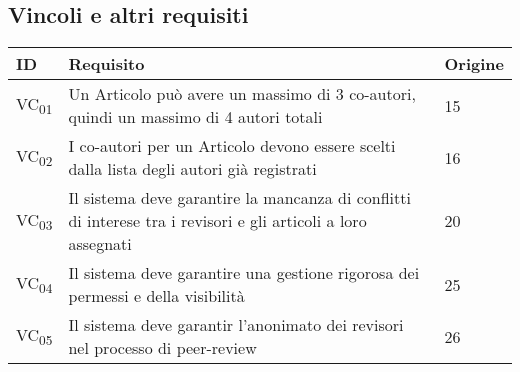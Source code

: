 \subsection{Vincoli e altri requisiti}
\label{sec:vincoli}
\begin{tabular}{|p{1cm}|p{9cm}|p{1cm}|}
  \hline
  \rowcolor{SkyBlue}
  ID & Requisito & Origine \\
  \hline
  \hline
  VC\textsubscript{01} & Un Articolo può avere un massimo di 3 co-autori, quindi un massimo di 4 autori totali & 15 \\
  \hline
  VC\textsubscript{02} &  I co-autori per un Articolo devono essere scelti dalla lista degli autori già registrati & 16 \\
  \hline
  VC\textsubscript{03} & Il sistema deve garantire la mancanza di conflitti di interese tra i revisori e gli articoli a loro assegnati & 20 \\
  \hline
  VC\textsubscript{04} & Il sistema deve garantire una gestione rigorosa dei permessi e della visibilità & 25 \\
  \hline
  VC\textsubscript{05} & Il sistema deve garantir l'anonimato dei revisori nel processo di peer-review & 26 \\
  \hline
\end{tabular}



